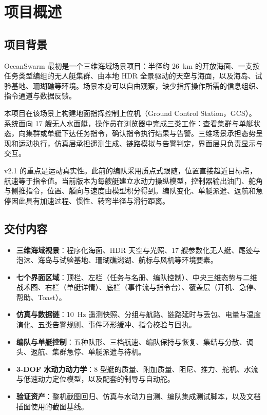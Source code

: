 \documentclass[UTF8, a4paper, 11pt]{ctexart}
\begin{document}
\newpage
\tableofcontents
\newpage

\setcounter{page}{1}

\section{项目概述}

\subsection{项目背景}

OceanSwarm 最初是一个三维海域场景项目：半径约 26~km 的开放海面、一支按任务类型编组的无人艇集群、由本地 HDR 全景驱动的天空与海面，以及海岛、试验基地、珊瑚礁等环境。场景本身可以自由观察，缺少指挥操作所需的信息组织、指令通道与数据反馈。

本项目在该场景上构建地面指挥控制上位机（Ground Control Station，GCS）。系统面向 17 艘无人水面艇，操作员在浏览器中完成三类工作：查看集群与单艇状态，向集群或单艇下达任务指令，确认指令执行结果与告警。三维场景承担态势呈现和运动执行，仿真层承担遥测生成、链路模拟与告警判定，界面层只负责显示与交互。

v2.1 的重点是运动真实性。此前的编队采用质点式跟随，位置直接趋近目标点，航速等于指令值。当前版本为每艘艇建立水动力操纵模型，控制器输出油门、舵角与侧推指令，位置、艏向与速度由模型积分得到。编队变化、单艇派遣、返航和急停因此具有加速过程、惯性、转弯半径与滑行距离。

\subsection{交付内容}

\begin{itemize}
  \item \textbf{三维海域视景}：程序化海面、HDR 天空与光照、17 艘参数化无人艇、尾迹与泡沫、海岛与试验基地、珊瑚礁潟湖、航标与风机等环境要素。
  \item \textbf{七个界面区域}：顶栏、左栏（任务与名册、编队控制）、中央三维态势与二维战术图、右栏（单艇详情）、底栏（事件流与指令台）、覆盖层（开机、急停、帮助、Toast）。
  \item \textbf{仿真与数据链}：10~Hz 遥测快照、分组与航路、链路延时与丢包、电量与温度演化、五类告警规则、事件环形缓冲、指令校验与回执。
  \item \textbf{编队与单艇控制}：五种队形、三档航速、编队保持与恢复、集结与分散、调头、返航、集群急停、单艇派遣与待机。
  \item \textbf{3-DOF 水动力动力学}：8 型艇的质量、附加质量、阻尼、推力、舵机、水流与低速动力定位模型，以及配套的制导与自动舵。
  \item \textbf{验证资产}：整机截图回归、仿真与水动力自测、编队集成测试脚本，以及文档插图使用的截图基线。
\end{itemize}
\end{document}
